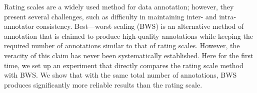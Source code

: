 Rating scales are a widely used method for data annotation; however, they present several challenges, such as difficulty in maintaining inter- and intra-annotator consistency. Best---worst scaling (BWS) is an alternative method of annotation that is claimed to produce high-quality annotations while keeping the required number of annotations similar to that of rating scales. However, the veracity of this claim has never been systematically established. Here for the first time, we set up an experiment that directly compares the rating scale method with BWS. We show that with the same total number of annotations, BWS produces significantly more reliable results than the rating scale.
